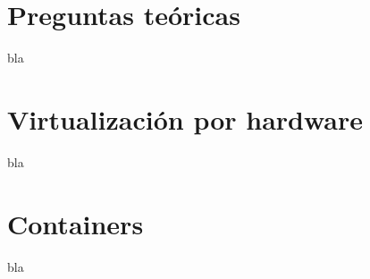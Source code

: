 \section{Preguntas teóricas}

\begin{questions}
\question bla
\end{questions}

\section{Virtualización por hardware}

\begin{questions}
  \question bla
\end{questions}

\section{Containers}

\begin{questions}
  \question bla
\end{questions}